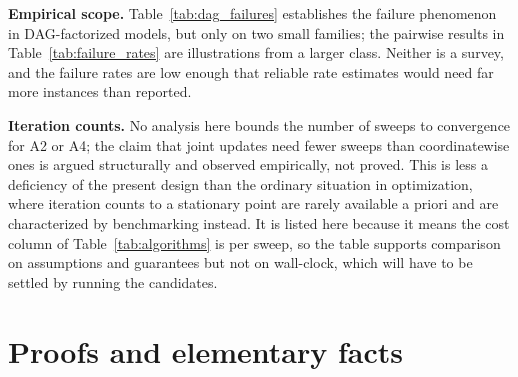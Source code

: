 \textbf{Empirical scope.} Table~\ref{tab:dag_failures} establishes the failure phenomenon in DAG-factorized models, but only on two small families; the pairwise results in Table~\ref{tab:failure_rates} are illustrations from a larger class. Neither is a survey, and the failure rates are low enough that reliable rate estimates would need far more instances than reported.

\textbf{Iteration counts.} No analysis here bounds the number of sweeps to convergence for A2 or A4; the claim that joint updates need fewer sweeps than coordinatewise ones is argued structurally and observed empirically, not proved. This is less a deficiency of the present design than the ordinary situation in optimization, where iteration counts to a stationary point are rarely available a priori and are characterized by benchmarking instead. It is listed here because it means the cost column of Table~\ref{tab:algorithms} is per sweep, so the table supports comparison on assumptions and guarantees but not on wall-clock, which will have to be settled by running the candidates.





\newpage
\appendix

\section{Proofs and elementary facts}
\label{sec:proofs}


